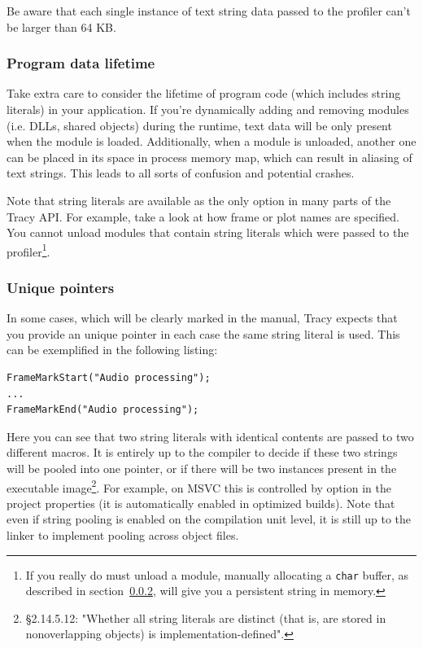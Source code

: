 \documentclass[hidelinks,titlepage,a4paper]{article}
\begin{document}
Be aware that each single instance of text string data passed to the profiler can't be larger than 64 KB.

\subsubsection{Program data lifetime}
\label{datalifetime}

Take extra care to consider the lifetime of program code (which includes string literals) in your application. If you're dynamically adding and removing modules (i.e. DLLs, shared objects) during the runtime, text data will be only present when the module is loaded. Additionally, when a module is unloaded, another one can be placed in its space in process memory map, which can result in aliasing of text strings. This leads to all sorts of confusion and potential crashes.

Note that string literals are available as the only option in many parts of the Tracy API. For example, take a look at how frame or plot names are specified. You cannot unload modules that contain string literals which were passed to the profiler\footnote{If you really do must unload a module, manually allocating a \texttt{char} buffer, as described in section~\ref{uniquepointers}, will give you a persistent string in memory.}.

\subsubsection{Unique pointers}
\label{uniquepointers}

In some cases, which will be clearly marked in the manual, Tracy expects that you provide an unique pointer in each case the same string literal is used. This can be exemplified in the following listing:

\begin{lstlisting}
FrameMarkStart("Audio processing");
...
FrameMarkEnd("Audio processing");
\end{lstlisting}

Here you can see that two string literals with identical contents are passed to two different macros. It is entirely up to the compiler to decide if these two strings will be pooled into one pointer, or if there will be two instances present in the executable image\footnote{\cite{ISO:2012:III} \S 2.14.5.12: "Whether all string literals are distinct (that is, are stored in nonoverlapping objects) is implementation-defined".}. For example, on MSVC this is controlled by  option in the project properties (it is automatically enabled in optimized builds). Note that even if string pooling is enabled on the compilation unit level, it is still up to the linker to implement pooling across object files.
\end{document}
